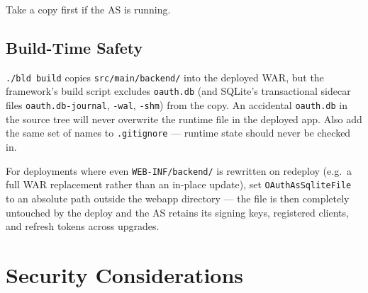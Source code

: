\noindent
Take a copy first if the AS is running.

\subsection{Build-Time Safety}

\texttt{./bld build} copies \texttt{src/main/backend/} into the deployed WAR, but the framework's build script excludes \texttt{oauth.db} (and SQLite's transactional sidecar files \texttt{oauth.db-journal}, \texttt{-wal}, \texttt{-shm}) from the copy.  An accidental \texttt{oauth.db} in the source tree will never overwrite the runtime file in the deployed app.  Also add the same set of names to \texttt{.gitignore} --- runtime state should never be checked in.

For deployments where even \texttt{WEB-INF/backend/} is rewritten on redeploy (e.g.\ a full WAR replacement rather than an in-place update), set \texttt{OAuthAsSqliteFile} to an absolute path outside the webapp directory --- the file is then completely untouched by the deploy and the AS retains its signing keys, registered clients, and refresh tokens across upgrades.

\section{Security Considerations}
\label{sec:as-security}

